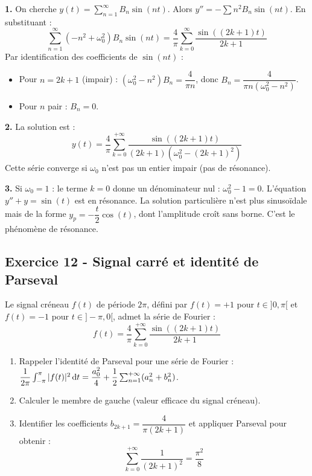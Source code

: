\documentclass[12pt,a4paper]{article}
\begin{document}
\begin{boitecorrige}
\textbf{1.} On cherche $y(t) = \sum_{n=1}^\infty B_n\sin(nt)$. Alors $y'' = -\sum n^2 B_n\sin(nt)$. En substituant :
\[
\sum_{n=1}^\infty(-n^2+\omega_0^2)B_n\sin(nt) = \frac{4}{\pi}\sum_{k=0}^\infty\frac{\sin((2k+1)t)}{2k+1}
\]
Par identification des coefficients de $\sin(nt)$ :
\begin{itemize}[nosep]
  \item Pour $n = 2k+1$ (impair) : $(\omega_0^2 - n^2)B_n = \dfrac{4}{\pi n}$, donc $B_n = \dfrac{4}{\pi n(\omega_0^2 - n^2)}$.
  \item Pour $n$ pair : $B_n = 0$.
\end{itemize}

\textbf{2.} La solution est :
\[
\boxed{y(t) = \frac{4}{\pi}\sum_{k=0}^{+\infty}\frac{\sin((2k+1)t)}{(2k+1)(\omega_0^2-(2k+1)^2)}}
\]
Cette série converge si $\omega_0$ n'est pas un entier impair (pas de résonance).

\textbf{3.} Si $\omega_0 = 1$ : le terme $k=0$ donne un dénominateur nul : $\omega_0^2 - 1 = 0$. L'équation $y'' + y = \sin(t)$ est en résonance. La solution particulière n'est plus sinusoïdale mais de la forme $y_p = -\dfrac{t}{2}\cos(t)$, dont l'amplitude croît sans borne. C'est le phénomène de résonance.
\end{boitecorrige}


\subsection*{Exercice 12 - Signal carré et identité de Parseval \niveau{\moyen}}

\begin{boiteexercice}
Le signal créneau $f(t)$ de période $2\pi$, défini par $f(t) = +1$ pour $t \in ]0,\pi[$ et $f(t) = -1$ pour $t \in ]-\pi,0[$, admet la série de Fourier :
\[
f(t) = \frac{4}{\pi}\sum_{k=0}^{+\infty}\frac{\sin((2k+1)t)}{2k+1}
\]
\begin{enumerate}
  \item Rappeler l'identité de Parseval pour une série de Fourier : $\dfrac{1}{2\pi}\int_{-\pi}^{\pi}|f(t)|^2\,\mathrm{d} t = \dfrac{a_0^2}{4} + \dfrac{1}{2}\sum_{n=1}^{+\infty}(a_n^2+b_n^2)$.
  \item Calculer le membre de gauche (valeur efficace du signal créneau).
  \item Identifier les coefficients $b_{2k+1} = \dfrac{4}{\pi(2k+1)}$ et appliquer Parseval pour obtenir :
  \[
  \sum_{k=0}^{+\infty}\frac{1}{(2k+1)^2} = \frac{\pi^2}{8}
  \]
\end{enumerate}
\end{boiteexercice}
\end{document}
